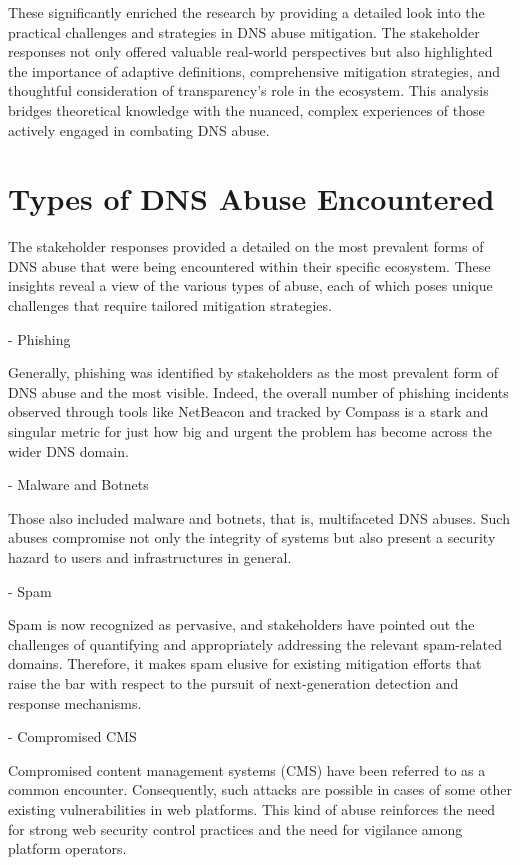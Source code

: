  These significantly enriched the research by providing a detailed look into the practical challenges and strategies in DNS abuse mitigation. The stakeholder responses not only offered valuable real-world perspectives but also highlighted the importance of adaptive definitions, comprehensive mitigation strategies, and thoughtful consideration of transparency's role in the ecosystem. This analysis bridges theoretical knowledge with the nuanced, complex experiences of those actively engaged in combating DNS abuse.

\section{Types of DNS Abuse Encountered} 

The stakeholder responses provided a detailed on the most prevalent forms of DNS abuse that were being encountered within their specific ecosystem. These insights reveal a view of the various types of abuse, each of which poses unique challenges that require tailored mitigation strategies.

- Phishing 

Generally, phishing was identified by stakeholders as the most prevalent form of DNS abuse and the most visible. Indeed, the overall number of phishing incidents observed through tools like NetBeacon and tracked by Compass is a stark and singular metric for just how big and urgent the problem has become across the wider DNS domain.

- Malware and Botnets

Those also included malware and botnets, that is, multifaceted DNS abuses. Such abuses compromise not only the integrity of systems but also present a security hazard to users and infrastructures in general.

- Spam

Spam is now recognized as pervasive, and stakeholders have pointed out the challenges of quantifying and appropriately addressing the relevant spam-related domains. Therefore, it makes spam elusive for existing mitigation efforts that raise the bar with respect to the pursuit of next-generation detection and response mechanisms.

- Compromised CMS

Compromised content management systems (CMS) have been referred to as a common encounter. Consequently, such attacks are possible in cases of some other existing vulnerabilities in web platforms. This kind of abuse reinforces the need for strong web security control practices and the need for vigilance among platform operators.


